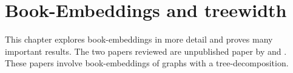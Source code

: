 \chapter{Book-Embeddings and treewidth}\label{chap:book-embeddings}

This chapter explores book-embeddings in more detail and proves many important results. The two papers reviewed are unpublished paper by \textcite{hickingbothamStackNumberCliqueSum2023} and \textcite{ganleyPagenumberTrees2001}. These papers involve book-embeddings of graphs with a tree-decomposition. 











